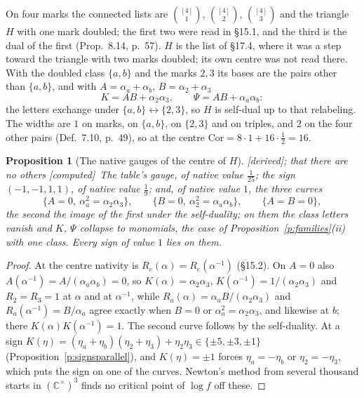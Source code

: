 \documentclass[11pt]{article}
\theoremstyle{plain}
\newtheorem{proposition}{Proposition}[section]
\theoremstyle{definition}
\theoremstyle{remark}
\newcommand{\derived}{\textup{[derived]}}
\newcommand{\computed}{\textup{[computed]}}
\begin{document}
On four marks the connected lists are $\binom{[4]}1$, $\binom{[4]}2$, $\binom{[4]}3$ and the triangle $H$ with one mark doubled; the first two were read in \S15.1, and the third is the dual of the first (Prop.~8.14, p.~57). $H$ is the list of \S17.4, where it was a step toward the triangle with two marks doubled; its own centre was not read there. With the doubled class $\{a,b\}$ and the marks $2,3$ its bases are the pairs other than $\{a,b\}$, and with $A=\alpha_a+\alpha_b$, $B=\alpha_2+\alpha_3$
\[
K=AB+\alpha_2\alpha_3,\qquad \Psi=AB+\alpha_a\alpha_b :
\]
the letters exchange under $\{a,b\}\leftrightarrow\{2,3\}$, so $H$ is self-dual up to that relabeling. The widths are $1$ on marks, on $\{a,b\}$, on $\{2,3\}$ and on triples, and $2$ on the four other pairs (Def.~7.10, p.~49), so at the centre $\mathrm{Cor}=8\cdot1+16\cdot\frac12=16$.

\begin{proposition}[The native gauges of the centre of $H$]\label{p:Hgauges}\derived; that there are no others \computed\
The table's gauge, of native value $\frac1{25}$; the sign $(-1,-1,1,1)$, of native value $\frac19$; and, of native value $1$, the three curves
\[
\{A=0,\ \alpha_a^2=\alpha_2\alpha_3\},\qquad \{B=0,\ \alpha_2^2=\alpha_a\alpha_b\},\qquad \{A=B=0\},
\]
the second the image of the first under the self-duality; on them the class letters vanish and $K$, $\Psi$ collapse to monomials, the case of Proposition~\ref{p:families}(ii) with one class. Every sign of value $1$ lies on them.
\end{proposition}

\begin{proof}
At the centre nativity is $R_e(\alpha)=R_e(\alpha^{-1})$ (\S15.2). On $A=0$ also $A(\alpha^{-1})=A/(\alpha_a\alpha_b)=0$, so $K(\alpha)=\alpha_2\alpha_3$, $K(\alpha^{-1})=1/(\alpha_2\alpha_3)$ and $R_2=R_3=1$ at $\alpha$ and at $\alpha^{-1}$, while $R_a(\alpha)=\alpha_aB/(\alpha_2\alpha_3)$ and $R_a(\alpha^{-1})=B/\alpha_a$ agree exactly when $B=0$ or $\alpha_a^2=\alpha_2\alpha_3$, and likewise at $b$; there $K(\alpha)K(\alpha^{-1})=1$. The second curve follows by the self-duality. At a sign $K(\eta)=(\eta_a+\eta_b)(\eta_2+\eta_3)+\eta_2\eta_3\in\{\pm5,\pm3,\pm1\}$ (Proposition~\ref{p:signsparallel}), and $K(\eta)=\pm1$ forces $\eta_a=-\eta_b$ or $\eta_2=-\eta_3$, which puts the sign on one of the curves. Newton's method from several thousand starts in $(\mathbb C^\times)^3$ finds no critical point of $\log f$ off these.
\end{proof}
\end{document}
